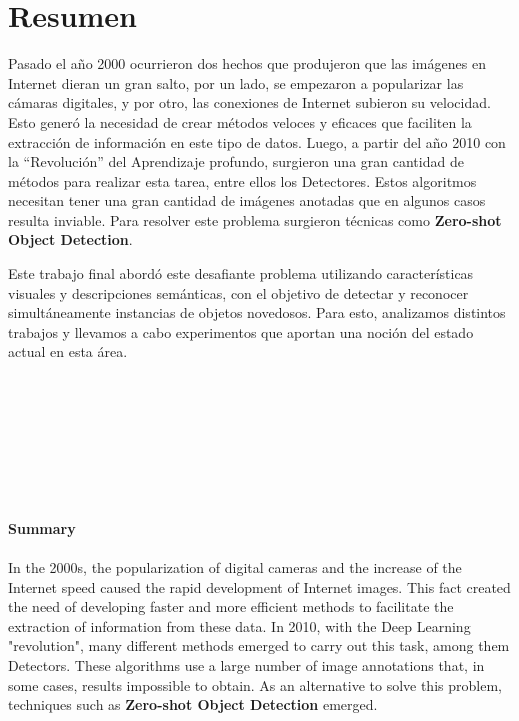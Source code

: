 \documentclass[12pt,twosided]{book}
\begin{document}
\chapter*{Resumen}

\pagestyle{plain}
Pasado el año 2000 ocurrieron dos hechos que produjeron que las imágenes en Internet dieran un gran salto, por un lado, se empezaron a popularizar las cámaras digitales, y por otro, las conexiones de Internet subieron su velocidad. Esto generó la necesidad de crear métodos veloces y eficaces que faciliten la extracción de información en este tipo de datos. Luego, a partir del año 2010 con la  ``Revolución'' del Aprendizaje profundo, surgieron una gran cantidad de métodos para realizar esta tarea, entre ellos los Detectores. Estos algoritmos necesitan tener una gran cantidad de imágenes anotadas que en algunos casos resulta inviable. Para resolver este problema surgieron técnicas como \textbf{Zero-shot Object Detection}. 

Este trabajo final abordó este desafiante problema utilizando características visuales y descripciones semánticas, con el objetivo de detectar y reconocer simultáneamente instancias de objetos novedosos. Para esto, analizamos distintos trabajos y llevamos a cabo experimentos que aportan una noción del estado actual en esta área. \\\\\\\\\\\\\\\\\\
{\huge\textbf{Summary}}\\\\

In the 2000s, the popularization of digital cameras and the increase of the Internet speed caused the rapid development of Internet images. This fact created the need of developing faster and more efficient methods to facilitate the extraction of information from these data. In 2010, with the Deep Learning "revolution", many different methods emerged to carry out this task, among them Detectors. These algorithms use a large number of image annotations that, in some cases, results impossible to obtain. As an alternative to solve this problem, techniques such as \textbf{Zero-shot Object Detection} emerged. 
\end{document}
